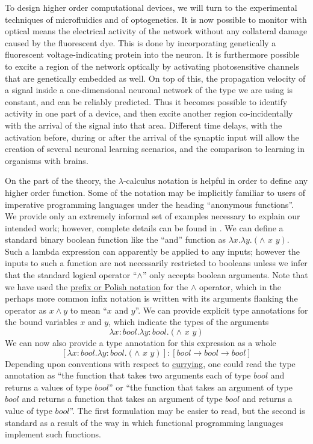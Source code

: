 To design higher order computational devices, we will turn to the experimental techniques of microfluidics and of optogenetics. 
It is now possible to monitor with optical means the electrical activity of the network without any collateral damage caused by the fluorescent dye. This is done by incorporating genetically a fluorescent voltage-indicating protein into the neuron. It is furthermore possible to excite a region of the network optically by activating photosensitive channels that are genetically embedded as well. On top of this, the propagation velocity of a signal inside a one-dimensional neuronal network of the type we are using is constant, and can be reliably predicted. Thus it becomes possible to identify activity in one part of a device, and then excite another region co-incidentally with the arrival of the signal into that area. Different time delays, with the activation before, during or after the arrival of the synaptic input will allow the creation of several neuronal learning scenarios, and the comparison to learning in organisms with brains.

On the part of the theory, the $\lambda$-calculus notation is helpful in
order to define any higher order function. Some of the notation may be
implicitly familiar to users of imperative programming languages under
the heading ``anonymous functions''. We provide only an extremely
informal set of examples necessary to explain our intended work;
however, complete details can be found in \cite{Barendregt1985}. We can define a
standard binary boolean function like the ``and'' function as $\lambda x. \lambda y.(\wedge\,\,x\,\,y)$. Such a lambda expression can apparently be applied to any inputs;
however the inputs to such a function are not necessarily restricted to
booleans unless we infer that the standard logical operator
``$\wedge$'' only accepts boolean arguments.
Note that we have used the
\href{http://en.wikipedia.org/wiki/Polish\_notation}{prefix or Polish
notation} for the $\wedge$ operator, which
in the perhaps more common infix notation is written with its arguments
flanking the operator as $x \wedge y$ to mean
``$x$ and
$y$''. We can provide explicit type
annotations for the bound variables $x$
and $y$, which indicate the types of
the arguments
\begin{equation}\label{eq:booltype}
\lambda x:bool. \lambda y:bool.(\wedge\,\,x\,\,y)
\end{equation}
We can now also provide a type annotation for this expression as a whole
\begin{equation}\label{eq:boolfulltype}
[\lambda x:bool. \lambda y:bool.(\wedge\,\,x\,\,y)]:[bool \rightarrow bool \rightarrow bool]
\end{equation}
Depending upon conventions with respect to
\href{http://en.wikipedia.org/wiki/Currying}{currying}, one could read
the type annotation as ``the function that takes two arguments each of
type $bool$ and returns a values of type
$bool$'' or ``the function that takes an
argument of type $bool$ and returns a
function that takes an argument of type
$bool$ and returns a value of type
$bool$''. The first formulation may be
easier to read, but the second is standard as a result of the way in
which functional programming languages implement such functions.

